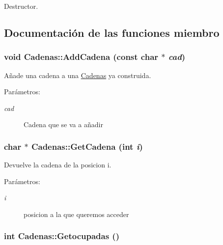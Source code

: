 Destructor. 



\subsection{Documentación de las funciones miembro}
\hypertarget{class_cadenas_f0a2b9594b2e528f02a3d164740b3250}{
\subsubsection[{AddCadena}]{\setlength{\rightskip}{0pt plus 5cm}void Cadenas::AddCadena (const char $\ast$ {\em cad})}}
\label{class_cadenas_f0a2b9594b2e528f02a3d164740b3250}


Añade una cadena a una \hyperlink{class_cadenas}{Cadenas} ya construida. 

\begin{Desc}
\item[Parámetros:]
\begin{description}
\item[{\em cad}]Cadena que se va a añadir \end{description}
\end{Desc}
\hypertarget{class_cadenas_2e84c2888f23b09add40633fbb3469e5}{
\subsubsection[{GetCadena}]{\setlength{\rightskip}{0pt plus 5cm}char $\ast$ Cadenas::GetCadena (int {\em i})}}
\label{class_cadenas_2e84c2888f23b09add40633fbb3469e5}


Devuelve la cadena de la posicion i. 

\begin{Desc}
\item[Parámetros:]
\begin{description}
\item[{\em i}]posicion a la que queremos acceder \end{description}
\end{Desc}
\hypertarget{class_cadenas_0d370148819ec089adf75645d181671c}{
\subsubsection[{Getocupadas}]{\setlength{\rightskip}{0pt plus 5cm}int Cadenas::Getocupadas ()}}
\label{class_cadenas_0d370148819ec089adf75645d181671c}


